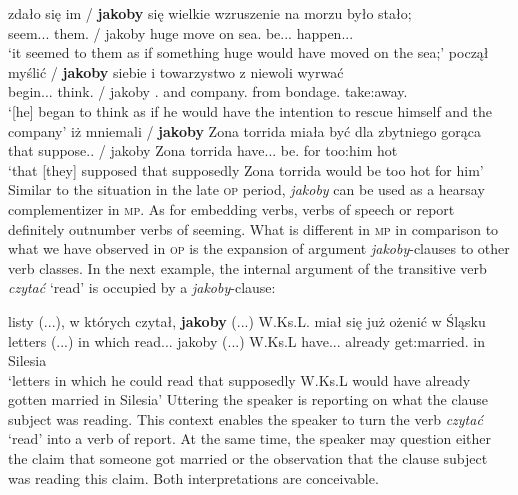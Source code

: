 \documentclass[output=paper
,modfonts
,nonflat]{langsci/langscibook}
\begin{document}
\ea \ea \gll	zdało się im / \textbf{jakoby} się wielkie wzruszenie na morzu było stało; \label{korba_seem} \\ 
		seem.{\lptcp}.{\sg}.{\n} {} them.{\dat} / jakoby {} huge move on sea.{\loc} be.{\lptcp}.{\sg}.{\n} happen.{\lptcp}.{\sg}.{\n} \\
	\glt	`it seemed to them as if something huge would have moved on the sea;'  	 
	\ex\gll	począł myślić / \textbf{jakoby} siebie i towarzystwo z niewoli wyrwać \label{korba_think} \\
		begin.{\lptcp}.{\sg}.{\masc} think.{\infv} / jakoby {}.{\acc} and company.{\acc} from bondage.{\gen} take:away.{\infv} \\
	\glt	`[he] began to think as if he would have the intention to rescue himself and the company'  	   
	\ex\gll	iż mniemali / \textbf{jakoby} Zona torrida miała być dla zbytniego gorąca \label{korba_suppose} \\
		that suppose.{\lptcp}.{\vir} / jakoby Zona torrida have.{\lptcp}.{\sg}.{\fem} be.{\infv} for {too:him} hot \\
	\glt	`that [they] supposed that supposedly Zona torrida would be too hot for him'  
\z\z
Similar to the situation in the late \textsc{op} period, \emph{jakoby} can be used as a hearsay complementizer in \textsc{mp}. As for embedding verbs, verbs of speech or report definitely outnumber verbs of seeming. What is different in \textsc{mp} in comparison to what we have observed in \textsc{op} is the expansion of argument \emph{jakoby}-clauses to other verb classes. In the next example, the internal argument of the transitive verb \emph{czytać} `read' is occupied by a \emph{jakoby}-clause:

\ea \gll listy (...), w których czytał, \textbf{jakoby} (...) W.Ks.L. miał się już ożenić w Śląsku \label{nic} \\
		letters (...) in which read.{\lptcp}.{\sg}.{\masc} jakoby (...) W.Ks.L have.{\lptcp}.{\sg}.{\masc} {} already {get:married}.{\infv} in Silesia \\
\glt	 `letters in which he could read that supposedly W.Ks.L would have already gotten married in Silesia'  
\z
Uttering  the speaker is reporting on what the clause subject was reading. This context enables the speaker to turn the verb \emph{czytać} `read' into a verb of report. At the same time, the speaker may question either the claim that someone got married or the observation that the clause subject was reading this claim. Both interpretations are conceivable. 
\end{document}
